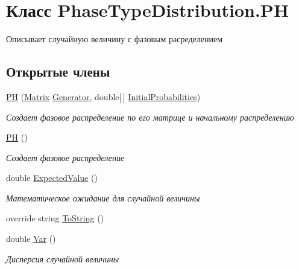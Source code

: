 \hypertarget{class_phase_type_distribution_1_1_p_h}{}\section{Класс Phase\+Type\+Distribution.\+PH}
\label{class_phase_type_distribution_1_1_p_h}


Описывает случайную величину с фазовым расределением  


\subsection*{Открытые члены}
\begin{DoxyCompactItemize}
\item 
\hyperlink{class_phase_type_distribution_1_1_p_h_ae7d0a336790e2efce690e860424ae6ab}{PH} (\hyperlink{class_b_l_a_s_1_1_matrix}{Matrix} \hyperlink{class_phase_type_distribution_1_1_p_h_a80552346d502e6805f79ea0262fb209f}{Generator}, double\mbox{[}$\,$\mbox{]} \hyperlink{class_phase_type_distribution_1_1_p_h_a987a901d55fcc253f34c42218dbb4456}{Initial\+Probabilities})
\begin{DoxyCompactList}\small\item\em Создает фазовое распределение по его матрице и начальному распределению \end{DoxyCompactList}\item 
\hyperlink{class_phase_type_distribution_1_1_p_h_aff4abc963d79bff793c3f5b8884a8975}{PH} ()
\begin{DoxyCompactList}\small\item\em Создает фазовое распределение \end{DoxyCompactList}\item 
double \hyperlink{class_phase_type_distribution_1_1_p_h_a170c80fcac45b3d05bfdf1df33d02f1c}{Expected\+Value} ()
\begin{DoxyCompactList}\small\item\em Математическое ожидание для случайной величины \end{DoxyCompactList}\item 
override string \hyperlink{class_phase_type_distribution_1_1_p_h_a2ce09b0ccf1ebd03e74a7854bc98e7a1}{To\+String} ()
\item 
double \hyperlink{class_phase_type_distribution_1_1_p_h_a2603d3b806c3ffcab85a7ea8e01a5010}{Var} ()
\begin{DoxyCompactList}\small\item\em Дисперсия случайной величины \end{DoxyCompactList}\end{DoxyCompactItemize}
